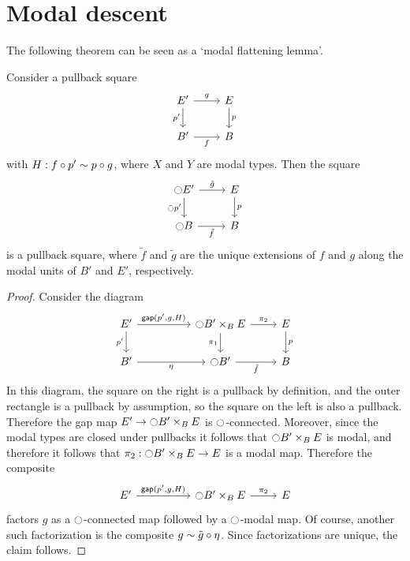 \documentclass[9pt,twosided]{amsart}
\begin{document}
\section{Modal descent}

The following theorem can be seen as a `modal flattening lemma'.
\begin{thm}\label{thm:etale_flattening}
Consider a pullback square
\begin{equation*}
\begin{tikzcd}
E' \arrow[d,swap,"{p'}"] \arrow[r,"g"] & E \arrow[d,"p"] \\
B' \arrow[r,swap,"f"] & B
\end{tikzcd}
\end{equation*}
with $H:f\circ p'\sim p\circ g$, where $X$ and $Y$ are modal types. Then the square
\begin{equation*}
\begin{tikzcd}
\modal E' \arrow[r,"\tilde{g}"] \arrow[d,swap,"{\modal p'}"] & E \arrow[d,"p"] \\
\modal B \arrow[r,swap,"\tilde{f}"] & B
\end{tikzcd}
\end{equation*}
is a pullback square, where $\tilde{f}$ and $\tilde{g}$ are the unique extensions of $f$ and $g$ along the modal units of $B'$ and $E'$, respectively.
\end{thm}

\begin{proof}
Consider the diagram
\begin{equation*}
\begin{tikzcd}
E' \arrow[r,"{\mathsf{gap}(p',g,H)}"] \arrow[d,swap,"{p'}"] &[2.5em] \modal B'\times_{B} E \arrow[r,"\pi_2"] \arrow[d,swap,"\pi_1"] & E \arrow[d,"p"] \\
B' \arrow[r,swap,"\modalunit"] & \modal B' \arrow[r,swap,"\tilde{f}"] & B
\end{tikzcd}
\end{equation*}
In this diagram, the square on the right is a pullback by definition, and the outer rectangle is a pullback by assumption, so the square on the left is also a pullback. Therefore the gap map $E'\to {\ensuremath{\ocircle}} B'\times_B E$ is ${\ocircle}$-connected. Moreover, since the modal types are closed under pullbacks it follows that ${\ocircle} B'\times_B E$ is modal, and therefore it follows that $\pi_2:{\ocircle} B'\times_B E\to E$ is a modal map. Therefore the composite
\begin{equation*}
\begin{tikzcd}
E' \arrow[r,"{\mathsf{gap}(p',g,H)}"] &[2.5em] \modal B'\times_{B} E \arrow[r,"\pi_2"] & E 
\end{tikzcd}
\end{equation*}
factors $g$ as a ${\ocircle}$-connected map followed by a ${\ocircle}$-modal map. Of course, another such factorization is the composite $g\sim \tilde{g}\circ{\eta_{}}$. Since factorizations are unique, the claim follows.
\end{proof}
\end{document}
